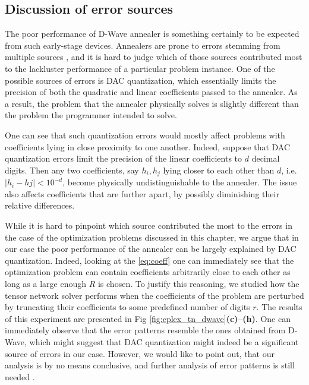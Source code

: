 \subsection{Discussion of error sources}

The poor performance of D-Wave annealer is something certainly to be expected
from such early-stage devices. Annealers are prone to errors stemming from
multiple sources \cite{dwavedocs}, and it is hard to judge which of those sources contributed
most to the lackluster performance of a particular problem instance.
One of the possible sources of errors is DAC quantization, which essentially
limits the precision of both the quadratic and linear coefficients passed to
the annealer. As a result, the problem that the annealer physically solves is
slightly different than the problem the programmer intended to solve.

One can see that such quantization errors would mostly affect problems with
coefficients lying in close proximity to one another. Indeed, suppose that DAC
quantization errors limit the precision of the linear coefficients to $d$
decimal digits. Then any two coefficients, say $h_{i}, h_{{j}}$ lying closer to
each other than $d$, i.e. $|h_{i} - h {j}| < 10^{-d}$, become physically
undistinguishable to the annealer. The issue also affects coefficients that are
further apart, by possibly diminishing their relative differences.

While it is hard to pinpoint which source contributed the most to the errors in
the case of the optimization problems discussed in this chapter, we argue that in
our case the poor performance of the annealer can be largely explained by DAC
quantization. Indeed, looking at the \eqref{eq:coeff} one can immediately see
that the optimization problem can contain coefficients arbitrarily close to
each other as long as a large enough $R$ is chosen. To justify this reasoning,
we studied how the tensor network solver performs when the coefficients of the
problem are perturbed by truncating their coefficients to some predefined
number of digits $r$. The results of this experiment are presented in Fig
\ref{fig:cplex_tn_dwave}\textbf{(c)--(h)}. One can immediately observe that the
error patterns resemble the ones obtained from D-Wave, which might suggest that
DAC quantization might indeed be a significant source of errors in our case.
However, we would like to point out, that our analysis is by no means
conclusive, and further analysis of error patterns is still needed .

